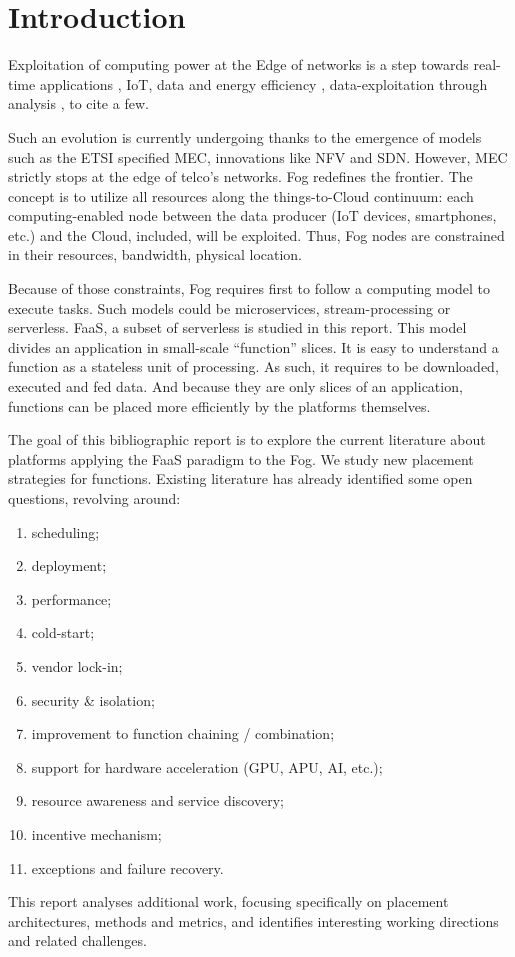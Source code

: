\section{Introduction}

Exploitation of computing power at the Edge of networks is a step towards real-time applications \cite{rausch_towards_2021,lin_cloudfog_2017}, \gls{IoT}, data and energy efficiency \cite{ieee_standards_association_ieee_2018}, data-exploitation through analysis \cite{openfog_consortium_real-time_2018}, to cite a few.

Such an evolution is currently undergoing thanks to the emergence of models such as the \gls{ETSI} specified \gls{MEC}, innovations like \gls{NFV} and \gls{SDN}. However, \gls{MEC} strictly stops at the edge of telco's networks. Fog redefines the frontier. The concept is to utilize all resources along the things-to-Cloud continuum: each computing-enabled node between the data producer (\gls{IoT} devices, smartphones, etc.) and the Cloud, included, will be exploited. Thus, Fog nodes are constrained in their resources, bandwidth, physical location.

Because of those constraints, Fog requires first to follow a computing model to execute tasks. Such models could be microservices, stream-processing or serverless. \gls{FaaS}, a subset of serverless is studied in this report. This model divides an application in small-scale ``function'' slices. It is easy to understand a function as a stateless unit of processing. As such, it requires to be downloaded, executed and fed data. And because they are only slices of an application, functions can be placed more efficiently by the platforms themselves.

The goal of this bibliographic report is to explore the current literature about platforms applying the \gls{FaaS} paradigm to the Fog. We study new placement strategies for functions. Existing literature \cite{kjorveziroski_iot_2021,xie_when_2021} has already identified some open questions, revolving around:
\begin{enumerate}[(1)]
	\item scheduling;
	\item deployment;
	\item performance;
	\item cold-start;
	\item vendor lock-in;
	\item security \& isolation;
	\item improvement to function chaining / combination;
	\item support for hardware acceleration (\gls{GPU}, \gls{APU}, \gls{AI}, etc.);
	\item resource awareness and service discovery;
	\item incentive mechanism;
	\item exceptions and failure recovery.
\end{enumerate}
This report analyses additional work, focusing specifically on placement architectures, methods and metrics, and identifies interesting working directions and related challenges.


